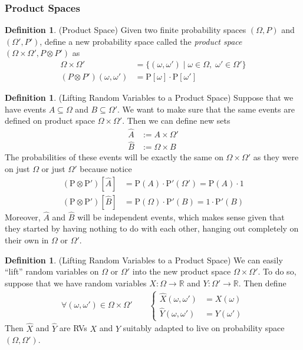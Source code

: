 \documentclass[12pt]{article}
\theoremstyle{plain}
\theoremstyle{definition}
\newtheorem{defn}[thm]{Definition}
\theoremstyle{remark}
\newcommand{\Prb}{\mathrm{P}}
\newcommand{\ra}{\rightarrow}
\newcommand{\R}{\mathbb{R}}
\begin{document}
\subsubsection{Product Spaces}

\begin{defn}{(Product Space)}
Given two finite probability spaces $(\Omega,P)$ and $(\Omega',P')$,
define a new probability space called the \emph{product space}
$(\Omega\times\Omega', P \otimes P')$ as
\begin{align*}
  \Omega\times\Omega'
  &= \{(\omega,\omega') \; |\; \omega\in\Omega, \; \omega'\in\Omega'\}
  \\
  (P \otimes P')(\omega, \omega')
  &= \Prb[\omega]\cdot \Prb[\omega']
\end{align*}
\end{defn}

\begin{defn}{(Lifting Random Variables to a Product Space)}
Suppose that we have events $A\subseteq \Omega$ and
$B\subseteq \Omega'$. We want to make sure that the same events are
defined on product space $\Omega\times \Omega'$. Then we can define new
sets
\begin{align*}
  \hat{A} &:= A\times \Omega' \\
  \hat{B} &:= \Omega \times B
\end{align*}
The probabilities of these events will be exactly the same on $\Omega
\times \Omega'$ as they were on just $\Omega$ or just $\Omega'$ because
notice
\begin{align*}
  (\Prb\otimes \Prb')[\hat{A}] &= \Prb(A) \cdot \Prb'(\Omega') = \Prb(A) \cdot 1\\
  (\Prb\otimes \Prb')[\hat{B}] &= \Prb(\Omega) \cdot \Prb'(B) = 1\cdot \Prb'(B)
\end{align*}
Moreover, $\hat{A}$ and $\hat{B}$ will be independent events, which
makes sense given that they started by having nothing to do with each
other, hanging out completely on their own in $\Omega$ or $\Omega'$.
\end{defn}

\begin{defn}{(Lifting Random Variables to a Product Space)}
We can easily ``lift'' random variables on $\Omega$ or $\Omega'$ into
the new product space $\Omega\times \Omega'$. To do so, suppose that we
have random variables $X:\Omega\ra\R$ and $Y:\Omega'\ra\R$. Then define
\begin{align*}
  \forall (\omega,\omega') \in \Omega\times \Omega' \qquad
  \begin{cases}
  \hat{X}(\omega, \omega') &= X(\omega) \\
  \hat{Y}(\omega, \omega') &= Y(\omega')
  \end{cases}
\end{align*}
Then $\hat{X}$ and $\hat{Y}$ are RVs $X$ and $Y$ suitably adapted to
live on probability space $(\Omega,\Omega')$.
\end{defn}
\end{document}
